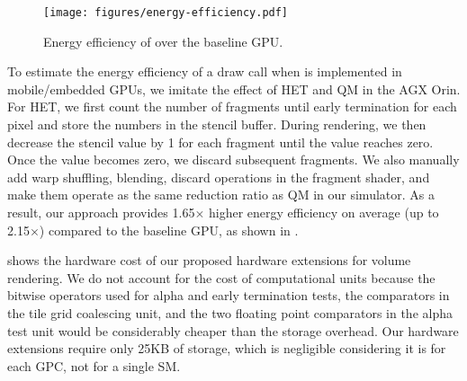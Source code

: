 
\begin{figure}[t]
  \centering
  \texttt{[image: figures/energy-efficiency.pdf]}
  \caption{Energy efficiency of \name{} over the baseline GPU.}
  \vspace{-0.10in}
  \label{fig:energy-efficiency}
\end{figure}

%
To estimate the energy efficiency of a draw call when \name{} is implemented
in mobile/embedded GPUs, we imitate the effect of HET and QM in the AGX Orin. 
%
For HET, we first count the number of fragments until early termination for each
pixel and store the numbers in the stencil buffer. 
% 
During rendering, we then decrease the stencil value by 1 for each fragment
until the value reaches zero. Once the value becomes zero, we discard subsequent
fragments.
%
We also manually add warp shuffling, blending, discard operations in the
fragment shader, and make them operate as the same reduction ratio as QM in our
simulator. 
%
As a result, our approach provides {1.65$\times$} higher energy efficiency on average (up
to {2.15$\times$}) compared to the baseline GPU, as shown in .


\begin{table}[b]
  \caption{Hardware cost of \name{}.}
  \centering
  \label{tab:hw-cost}
\end{table}

 shows the hardware cost of our proposed hardware extensions
for volume rendering. We do not account for the cost of computational units
because the bitwise operators used for alpha and early termination tests, the
comparators in the tile grid coalescing unit, and the two floating point
comparators in the alpha test unit would be considerably cheaper than the
storage overhead.
%
Our hardware extensions require only 25KB of storage, which is negligible
considering it is for each GPC, not for a single SM.
